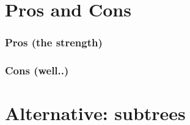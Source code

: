 \documentclass[10pt]{beamer}
\begin{document}
\section{Pros and Cons}

\begin{frame}
  \frametitle{Pros (the strength)}
  
\end{frame}

\begin{frame}
	\frametitle{Cons (well..)}
\end{frame}

\section{Alternative: subtrees}
\end{document}
